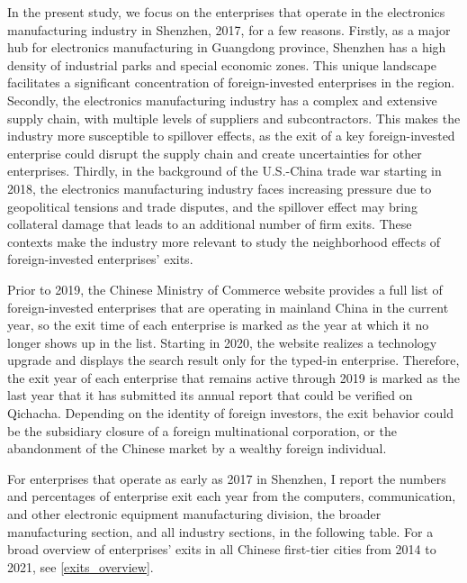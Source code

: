 In the present study, we focus on the enterprises that operate in the electronics manufacturing industry in Shenzhen, 2017, for a few reasons. Firstly, as a major hub for electronics manufacturing in Guangdong province, Shenzhen has a high density of industrial parks and special economic zones. This unique landscape facilitates a significant concentration of foreign-invested enterprises in the region. Secondly, the electronics manufacturing industry has a complex and extensive supply chain, with multiple levels of suppliers and subcontractors. This makes the industry more susceptible to spillover effects, as the exit of a key foreign-invested enterprise could disrupt the supply chain and create uncertainties for other enterprises. Thirdly, in the background of the U.S.-China trade war starting in 2018, the electronics manufacturing industry faces increasing pressure due to geopolitical tensions and trade disputes, and the spillover effect may bring collateral damage that leads to an additional number of firm exits. These contexts make the industry more relevant to study the neighborhood effects of foreign-invested enterprises' exits.

Prior to 2019, the Chinese Ministry of Commerce website provides a full list of foreign-invested enterprises that are operating in mainland China in the current year, so the exit time of each enterprise is marked as the year at which it no longer shows up in the list. Starting in 2020, the website realizes a technology upgrade and displays the search result only for the typed-in enterprise. Therefore, the exit year of each enterprise that remains active through 2019 is marked as the last year that it has submitted its annual report that could be verified on Qichacha. Depending on the identity of foreign investors, the exit behavior could be the subsidiary closure of a foreign multinational corporation, or the abandonment of the Chinese market by a wealthy foreign individual.

For enterprises that operate as early as 2017 in Shenzhen, I report the numbers and percentages of enterprise exit each year from the computers, communication, and other electronic equipment manufacturing division, the broader manufacturing section, and all industry sections, in the following table. For a broad overview of enterprises' exits in all Chinese first-tier cities from 2014 to 2021, see \ref{exits_overview}.

